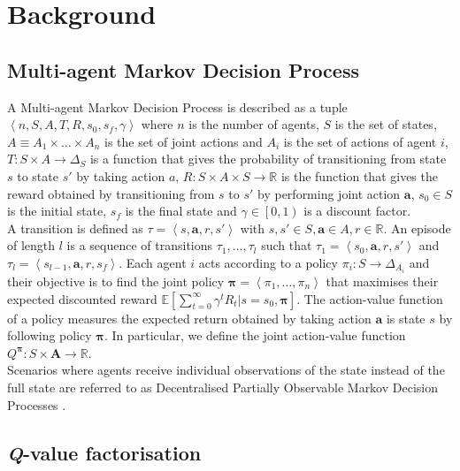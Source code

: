 \section{Background}

\subsection{Multi-agent Markov Decision Process}
\label{sec:mdp}
A Multi-agent Markov Decision Process \citep[MMDP]{boutilier_planning_1996} is described as a tuple $\left<n, S, A, T, R, s_0, s_f, \gamma\right>$ where $n$ is the number of agents, $S$ is the set of states, $A \equiv A_1 \times \dots \times A_n$ is the set of joint actions and $A_i$ is the set of actions of agent $i$, $T\colon S \times A \rightarrow \Delta_S$ is a function that gives the probability of transitioning from state $s$ to state $s'$ by taking action $a$, $R: S \times A \times S \rightarrow \mathbb{R}$ is the function that gives the reward obtained by transitioning from $s$ to $s'$ by performing joint action $\bm{a}$, $s_0 \in S$ is the initial state, $s_f$ is the final state and $\gamma \in \left[0, 1\right)$ is a discount factor.\\
A transition is defined as $\tau = \left<s, \bm{a}, r, s'\right>$ with $ s, s' \in S, \bm{a} \in A, r \in \mathbb{R}$. An episode of length $l$ is a sequence of transitions $\tau_1, \dots, \tau_l$ such that $\tau_1 = \left< s_0, \bm{a}, r, s'\right>$ and $\tau_l = \left<s_{l-1}, \bm{a}, r, s_f\right>$. Each agent $i$ acts according to a policy $\pi_i \colon S  \rightarrow \Delta_{A_i}$ and their objective is to find the joint policy $\bm{\pi} = \left<\pi_1, \dots, \pi_n\right>$ that maximises their expected discounted reward $\mathbb{E}\left[\sum_{t=0}^{\infty} \gamma^{t} R_t | s=s_0, \bm{\pi}\right]$. The action-value function of a policy measures the expected return obtained by taking action $\bm{a}$ is state $s$ by following policy $\bm{\pi}$. In particular, we define the joint action-value function $Q^{\bm{\pi}}: S \times \bm{A} \rightarrow \mathbb{R}$.\\
Scenarios where agents receive individual observations of the state instead of the full state are referred to as Decentralised Partially Observable Markov Decision Processes \citep{oliehoek_concise_2016_pomdp}.


\subsection{\textit{Q}-value factorisation}
\label{sec:ctde}

